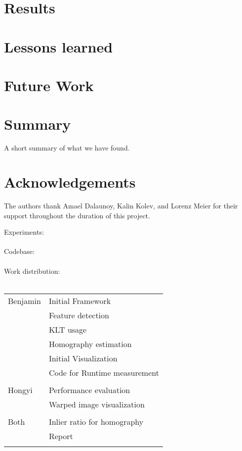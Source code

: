 \documentclass[10pt,conference,compsocconf]{IEEEtran}
\begin{document}
\section{Results}

\section{Lessons learned}

\section{Future Work}


\section{Summary}

A short summary of what we have found.

\section*{Acknowledgements}
The authors thank Amael Dalaunoy, Kalin Kolev, and Lorenz Meier for their support throughout the duration of this project. 




\newpage
\appendix
Experiments:\\\\

\appendix
Codebase:\\\\

\appendix
Work distribution:\\\\
\begin{tabular}{l l}
Benjamin & Initial Framework \\
& Feature detection \\
& KLT usage \\
& Homography estimation \\
& Initial Visualization \\
& Code for Runtime measurement\\
\\
Hongyi & Performance evaluation \\
& Warped image visualization\\
\\
Both & Inlier ratio for homography \\
& Report\\
\\
\end{tabular} 
\end{document}
